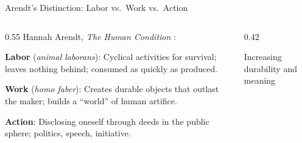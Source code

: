 ﻿\documentclass[aspectratio=169,11pt]{beamer}
\begin{document}
\begin{frame}{Arendt's Distinction: Labor vs.\ Work vs.\ Action}
\begin{columns}[T]
\begin{column}{0.55\textwidth}
Hannah Arendt, \emph{The Human Condition} \parencite{arendt_human_condition}:

\vspace{0.2em}
\textbf{Labor} (\emph{animal laborans}): Cyclical activities for survival; leaves nothing behind; consumed as quickly as produced.

\vspace{0.2em}
\textbf{Work} (\emph{homo faber}): Creates durable objects that outlast the maker; builds a ``world'' of human artifice.

\vspace{0.2em}
\textbf{Action}: Disclosing oneself through deeds in the public sphere; politics, speech, initiative.
\end{column}
\begin{column}{0.42\textwidth}
\begin{center}
\end{center}
{\scriptsize Increasing durability and meaning}
\end{column}
\end{columns}
\end{frame}
\end{document}
